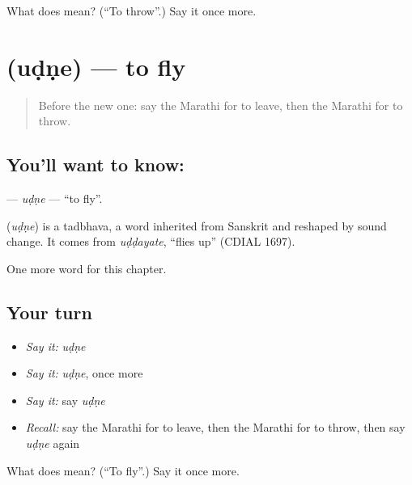 \begin{tcolorbox}[breakable,colback=teal!4,colframe=teal!35!black,title={Before you move on}]
What does  mean? (\textquotedblleft{}To throw\textquotedblright{}.) Say it once more.
\end{tcolorbox}
\section[\texorpdfstring{\mr{उडणे} (uḍṇe)}{उडणे (uḍṇe)}]{ (uḍṇe) — to fly}

\label{lesson:MR-C82-udne}



\begin{quote}
Before the new one: say the Marathi for to leave, then the Marathi for to throw.
\end{quote}

\subsection*{You'll want to know: }
\textbf{} — \emph{uḍṇe} — \textquotedblleft{}to fly\textquotedblright{}.

\begin{cousinweb}
\textbf{} (\emph{uḍṇe}) is a tadbhava, a word inherited from Sanskrit and reshaped by sound change. It comes from \emph{uḍḍayate}, \textquotedblleft{}flies up\textquotedblright{} (CDIAL 1697).
\end{cousinweb}

\begin{grammarlens}[title={What you've built}]
One more word for this chapter.
\end{grammarlens}

\subsection*{Your turn}
\begin{itemize}
\raggedright
  \item \emph{Say it:} \emph{uḍṇe}
  \item \emph{Say it:} \emph{uḍṇe}, once more
  \item \emph{Say it:} say \emph{uḍṇe}
  \item \emph{Recall:} say the Marathi for to leave, then the Marathi for to throw, then say \emph{uḍṇe} again
\end{itemize}

\begin{tcolorbox}[breakable,colback=teal!4,colframe=teal!35!black,title={Before you move on}]
What does  mean? (\textquotedblleft{}To fly\textquotedblright{}.) Say it once more.
\end{tcolorbox}
